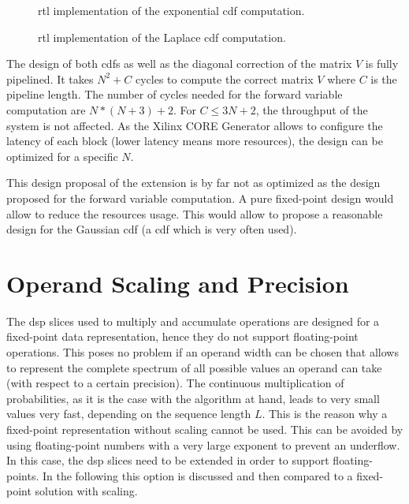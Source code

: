 \documentclass[mscthesis]{usiinfthesis}
\begin{document}
\begin{figure}
    \centering
    
    \caption{\acrshort{rtl} implementation of the exponential \acrshort{cdf}
        computation.}
    \label{fig:arch_cdf1}
\end{figure}

\begin{figure}
    \centering
    
    \caption{\acrshort{rtl} implementation of the Laplace \acrshort{cdf}
        computation.}
    \label{fig:arch_cdf2}
\end{figure}

The design of both \glspl{cdf} as well as the diagonal correction of the matrix
$V$ is fully pipelined. It takes $N^2+C$ cycles to compute the correct matrix
$V$ where $C$ is the pipeline length. The number of cycles needed for the
forward variable computation are $N*(N+3)+2$. For $C \leq 3N+2$, the throughput
of the system is not affected. As the Xilinx CORE Generator allows to configure
the latency of each block (lower latency means more resources), the design can
be optimized for a specific $N$.

This design proposal of the extension is by far not as optimized as the design
proposed for the forward variable computation. A pure fixed-point design
would allow to reduce the resources usage. This would allow to propose
a reasonable design for the Gaussian \gls{cdf} (a \gls{cdf} which is very
often used).

\section{Operand Scaling and Precision}
\label{ch:design_scaling}

The \gls{dsp} slices used to multiply and accumulate operations are designed
for a fixed-point data representation, hence they do not support floating-point
operations. This poses no problem if an operand width can be chosen that allows
to represent the complete spectrum of all possible values an operand can take
(with respect to a certain precision). The continuous multiplication of
probabilities, as it is the case with the algorithm at hand, leads to very small
values very fast, depending on the sequence length $L$. This is the reason why
a fixed-point representation without scaling cannot be used. This can be
avoided by using floating-point numbers with a very large exponent to
prevent an underflow. In this case, the \gls{dsp} slices need to be extended in
order to support floating-points. In the following this option is discussed and
then compared to a fixed-point solution with scaling.
\end{document}
